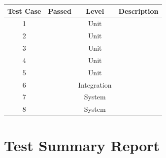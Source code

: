 \documentclass[11pt]{article}
\newcommand{\cmark}{\ding{51}}%
\newcommand{\xmark}{\ding{55}}
\begin{document}
\begin{center}
\begin{tabular}{|c|c|c|p{8em}|}
	\hline
	\textbf{Test Case} & \textbf{Passed} & \textbf{Level} & \multicolumn{1}{c|}{\textbf{Description}} \\
	\hline
	1 & \textcolor{pass_grn}{\cmark} & Unit & \\
	\hline
	2 & \textcolor{fail_red}{\xmark} & Unit & \\
	\hline
	3 & \textcolor{pass_grn}{\cmark} & Unit & \\
	\hline
	4 & \textcolor{pass_grn}{\cmark} & Unit & \\
	\hline
	5 & \textcolor{pass_grn}{\cmark} & Unit & \\
	\hline
	6 & \textcolor{pass_grn}{\cmark} & Integration & \\
	\hline
	7 & \textcolor{pass_grn}{\cmark} & System & \\
	\hline
	8 & \textcolor{pass_grn}{\cmark} & System & \\
	\hline
\end{tabular}
\end{center}

\section{Test Summary Report}%
\end{document}

